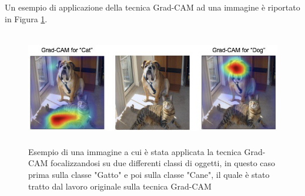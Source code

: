 Un esempio di applicazione della tecnica Grad-CAM ad una immagine è riportato in Figura \ref{gradcam_gen}.

\begin{figure}[H]
\centering
\includegraphics[height=50mm]{images/gradcam_generica.jpg}
\caption{Esempio di una immagine a cui è stata applicata la tecnica Grad-CAM focalizzandosi su due differenti classi di oggetti, in questo caso prima sulla classe "Gatto" e poi sulla classe "Cane", il quale è stato tratto dal lavoro originale sulla tecnica Grad-CAM \cite{selvaraju2017grad}}
\label{gradcam_gen}
\end{figure}

